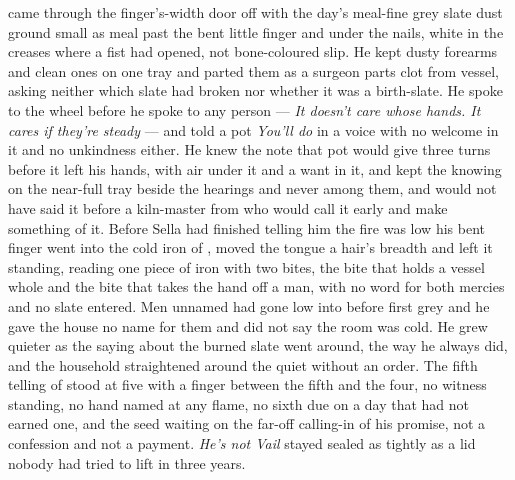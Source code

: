  came through the finger's-width door off  with the day's meal-fine grey slate dust ground small as meal past the bent little finger and under the nails, white in the creases where a fist had opened, not bone-coloured slip. He kept dusty forearms and clean ones on one tray and parted them as a surgeon parts clot from vessel, asking neither which slate had broken nor whether it was a birth-slate. He spoke to the wheel before he spoke to any person --- \emph{It doesn't care whose hands. It cares if they're steady} --- and told a pot \emph{You'll do} in a voice with no welcome in it and no unkindness either. He knew the note that pot would give three turns before it left his hands, with air under it and a want in it, and kept the knowing on the near-full tray beside the hearings and never among them, and would not have said it before a kiln-master from  who would call it early and make something of it. Before Sella had finished telling him the fire was low his bent finger went into the cold iron of , moved the tongue a hair's breadth and left it standing, reading one piece of iron with two bites, the bite that holds a vessel whole and the bite that takes the hand off a man, with no  word for both mercies and no slate entered. Men unnamed had gone low into  before first grey and he gave the house no name for them and did not say the room was cold. He grew quieter as the saying about the burned slate went around, the way he always did, and the household straightened around the quiet without an order. The fifth telling of  stood at five with a finger between the fifth and the four, no witness standing, no hand named at any flame, no sixth due on a day that had not earned one, and the seed waiting on the far-off calling-in of his promise, not a confession and not a payment. \emph{He's not Vail} stayed sealed as tightly as a lid nobody had tried to lift in three years.


